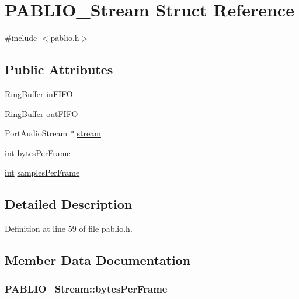 \hypertarget{struct_p_a_b_l_i_o___stream}{}\section{P\+A\+B\+L\+I\+O\+\_\+\+Stream Struct Reference}
\label{struct_p_a_b_l_i_o___stream}


{\ttfamily \#include $<$pablio.\+h$>$}

\subsection*{Public Attributes}
\begin{DoxyCompactItemize}
\item 
\hyperlink{class_ring_buffer}{Ring\+Buffer} \hyperlink{struct_p_a_b_l_i_o___stream_a9e71b0fedc0c6eb9617f7fbcd533e900}{in\+F\+I\+FO}
\item 
\hyperlink{class_ring_buffer}{Ring\+Buffer} \hyperlink{struct_p_a_b_l_i_o___stream_a6bb74b5a753c8bd75f8e352edac68fcc}{out\+F\+I\+FO}
\item 
Port\+Audio\+Stream $\ast$ \hyperlink{struct_p_a_b_l_i_o___stream_a39b571d723a0ca5f7b8350e81bb0e2e3}{stream}
\item 
\hyperlink{xmltok_8h_a5a0d4a5641ce434f1d23533f2b2e6653}{int} \hyperlink{struct_p_a_b_l_i_o___stream_aa6d4effd361a458fd577c3c909c8cf5a}{bytes\+Per\+Frame}
\item 
\hyperlink{xmltok_8h_a5a0d4a5641ce434f1d23533f2b2e6653}{int} \hyperlink{struct_p_a_b_l_i_o___stream_aa60b21938c04f7836a235a33ad27e0d3}{samples\+Per\+Frame}
\end{DoxyCompactItemize}


\subsection{Detailed Description}


Definition at line 59 of file pablio.\+h.



\subsection{Member Data Documentation}
\subsubsection[{\texorpdfstring{bytes\+Per\+Frame}{bytesPerFrame}}]{ P\+A\+B\+L\+I\+O\+\_\+\+Stream\+::bytes\+Per\+Frame}\hypertarget{struct_p_a_b_l_i_o___stream_aa6d4effd361a458fd577c3c909c8cf5a}{}\label{struct_p_a_b_l_i_o___stream_aa6d4effd361a458fd577c3c909c8cf5a}


